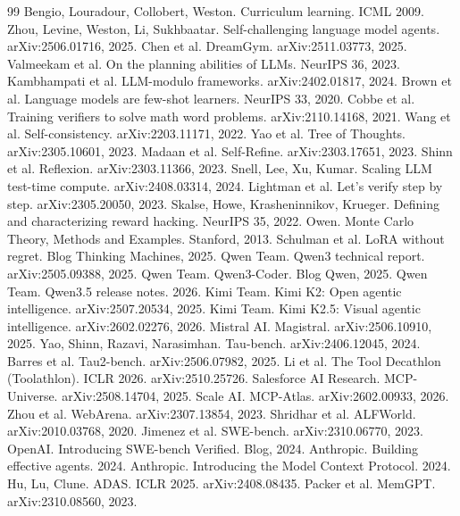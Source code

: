 \begin{thebibliography}{99}
 Bengio, Louradour, Collobert, Weston. Curriculum learning. ICML 2009.
 Zhou, Levine, Weston, Li, Sukhbaatar. Self-challenging language model agents. arXiv:2506.01716, 2025.
 Chen et al. DreamGym. arXiv:2511.03773, 2025.
 Valmeekam et al. On the planning abilities of LLMs. NeurIPS 36, 2023.
 Kambhampati et al. LLM-modulo frameworks. arXiv:2402.01817, 2024.
 Brown et al. Language models are few-shot learners. NeurIPS 33, 2020.
 Cobbe et al. Training verifiers to solve math word problems. arXiv:2110.14168, 2021.
 Wang et al. Self-consistency. arXiv:2203.11171, 2022.
 Yao et al. Tree of Thoughts. arXiv:2305.10601, 2023.
 Madaan et al. Self-Refine. arXiv:2303.17651, 2023.
 Shinn et al. Reflexion. arXiv:2303.11366, 2023.
 Snell, Lee, Xu, Kumar. Scaling LLM test-time compute. arXiv:2408.03314, 2024.
 Lightman et al. Let's verify step by step. arXiv:2305.20050, 2023.
 Skalse, Howe, Krasheninnikov, Krueger. Defining and characterizing reward hacking. NeurIPS 35, 2022.
 Owen. Monte Carlo Theory, Methods and Examples. Stanford, 2013.
 Schulman et al. LoRA without regret. Blog Thinking Machines, 2025.
 Qwen Team. Qwen3 technical report. arXiv:2505.09388, 2025.
 Qwen Team. Qwen3-Coder. Blog Qwen, 2025.
 Qwen Team. Qwen3.5 release notes. 2026. %
 Kimi Team. Kimi K2: Open agentic intelligence. arXiv:2507.20534, 2025.
 Kimi Team. Kimi K2.5: Visual agentic intelligence. arXiv:2602.02276, 2026.
 Mistral AI. Magistral. arXiv:2506.10910, 2025.
 Yao, Shinn, Razavi, Narasimhan. Tau-bench. arXiv:2406.12045, 2024.
 Barres et al. Tau2-bench. arXiv:2506.07982, 2025.
 Li et al. The Tool Decathlon (Toolathlon). ICLR 2026. arXiv:2510.25726.
 Salesforce AI Research. MCP-Universe. arXiv:2508.14704, 2025.
 Scale AI. MCP-Atlas. arXiv:2602.00933, 2026.
 Zhou et al. WebArena. arXiv:2307.13854, 2023.
 Shridhar et al. ALFWorld. arXiv:2010.03768, 2020.
 Jimenez et al. SWE-bench. arXiv:2310.06770, 2023.
 OpenAI. Introducing SWE-bench Verified. Blog, 2024.
 Anthropic. Building effective agents. 2024.
 Anthropic. Introducing the Model Context Protocol. 2024.
 Hu, Lu, Clune. ADAS. ICLR 2025. arXiv:2408.08435.
 Packer et al. MemGPT. arXiv:2310.08560, 2023.


\end{thebibliography}
